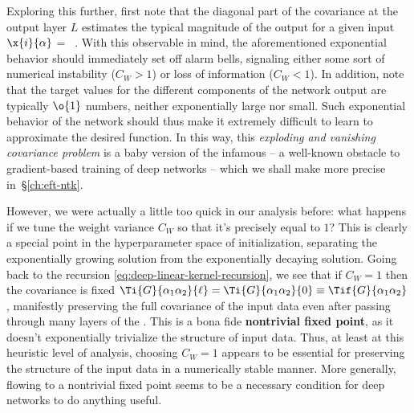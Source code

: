 Exploring this further, first note that
the diagonal part of the covariance at the output layer $L$ estimates the typical magnitude of the output for a given input $\x{i}{\alpha}$
\be
{} =   \, .
\ee
With this observable in mind, the aforementioned exponential behavior should immediately set off alarm bells, signaling either some sort of numerical instability ($C_W>1$) or loss of information ($C_W<1$). 
In addition, note that the target values for the different components of the network output are typically $\o{1}$ numbers, neither exponentially large nor small. Such exponential behavior of the network should thus make it extremely difficult to learn to approximate the desired function.
In this way, this \emph{exploding and vanishing covariance problem} is a baby version of the infamous  -- a well-known obstacle to gradient-based training of deep networks -- which we shall make more precise in~\S\ref{ch:eft-ntk}. %

However, we were actually a little too quick in our analysis before: what happens if we tune the weight variance $C_W$ so that it's precisely equal to $1$? This is clearly a special point in the hyperparameter space of initialization, separating the exponentially growing solution from the exponentially decaying solution. Going back to the recursion \eqref{eq:deep-linear-kernel-recursion}, we see that if $C_W=1$ then the covariance is fixed $\Ti{G}{\alpha_1\alpha_2}{\ell}=\Ti{G}{\alpha_1\alpha_2}{0}\equiv\Tif{G}{\alpha_1\alpha_2}$, manifestly preserving the full covariance of the input data even after passing through many layers of the .
This is a bona fide \textbf{nontrivial fixed point}, as it doesn't exponentially trivialize the structure of input data.
Thus, at least at this heuristic level of analysis, choosing $C_W=1$  appears to be essential for preserving the structure of the input data in a numerically stable manner. More generally, flowing to a nontrivial fixed point seems to be a necessary condition for deep networks to do anything useful.

